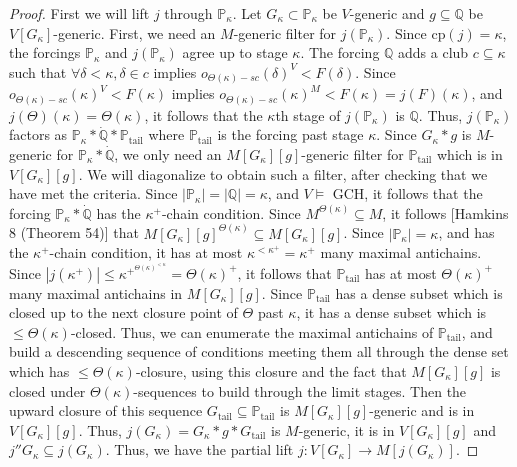 \documentclass[10pt,a4paper]{amsart}
\begin{document}
\begin{proof}
 First we will lift $j$ through $\mathbb{P}_{\kappa}$. Let $G_{\kappa} \subset \mathbb{P}_{\kappa}$ be $V$-generic and $g \subseteq \mathbb{Q}$ be $V[G_{\kappa}]$-generic. First, we need an $M$-generic filter for $j(\mathbb{P}_{\kappa})$. Since cp$(j) = \kappa$, the forcings $\mathbb{P}_{\kappa}$ and $j(\mathbb{P}_{\kappa})$ agree up to stage $\kappa$. The forcing $\mathbb{Q}$ adds a club $c \subseteq \kappa$ such that $\forall \delta < \kappa, \delta \in c$ implies $o_{\Theta(\kappa)-sc}(\delta)^V < F(\delta)$. Since $o_{\Theta(\kappa)-sc}(\kappa)^V < F(\kappa)$ implies $o_{\Theta(\kappa)-sc}(\kappa)^M < F(\kappa) = j(F)(\kappa)$, and $j(\Theta)(\kappa) = \Theta(\kappa)$, it follows that the $\kappa$th stage of $j(\mathbb{P}_{\kappa})$ is $\mathbb{Q}$. Thus, $j(\mathbb{P}_{\kappa})$ factors as $\mathbb{P}_{\kappa}*\dot{\mathbb{Q}}*\mathbb{P}_{\mbox{tail}}$ where $\mathbb{P}_{\mbox{tail}}$ is the forcing past stage $\kappa$. Since $G_{\kappa}*g$ is $M$-generic for $\mathbb{P}_{\kappa}*\dot{\mathbb{Q}}$, we only need an $M[G_{\kappa}][g]$-generic filter for $\mathbb{P}_{\mbox{tail}}$ which is in $V[G_{\kappa}][g]$. We will diagonalize to obtain such a filter, after checking that we have met the criteria. Since $|\mathbb{P}_{\kappa}|=|\mathbb{Q}| = \kappa$, and $V \models $ GCH, it follows that the forcing $\mathbb{P}_{\kappa}*\dot{\mathbb{Q}}$ has the $\kappa^+$-chain condition. Since $M^{\Theta(\kappa)} \subseteq M$, it follows [Hamkins 8 (Theorem 54)] that $M[G_{\kappa}][g]^{\Theta(\kappa)} \subseteq M[G_{\kappa}][g]$. Since $|\mathbb{P}_{\kappa}| = \kappa$, and has the $\kappa^+$-chain condition, it has at most $\kappa^{<\kappa^+} = \kappa^+$ many maximal antichains. Since $|j(\kappa^+)| \le \kappa^{+^{\Theta(\kappa)^{< \kappa}}} = \Theta(\kappa)^+$, it follows that $\mathbb{P}_{\mbox{tail}}$ has at most $\Theta(\kappa)^+$ many maximal antichains in $M[G_{\kappa}][g]$. Since $\mathbb{P}_{\mbox{tail}}$ has a dense subset which is closed up to the next closure point of $\Theta$ past $\kappa$, it has a dense subset which is $\le \Theta(\kappa)$-closed. Thus, we can enumerate the maximal antichains of $\mathbb{P}_{\mbox{tail}}$, and build a descending sequence of conditions meeting them all through the dense set which has $\le \Theta(\kappa)$-closure, using this closure and the fact that $M[G_{\kappa}][g]$ is closed under $\Theta(\kappa)$-sequences to build through the limit stages. Then the upward closure of this sequence $G_{\mbox{tail}} \subseteq \mathbb{P}_{\mbox{tail}}$ is $M[G_{\kappa}][g]$-generic and is in $V[G_{\kappa}][g]$. Thus, $j(G_{\kappa}) = G_{\kappa}*g*G_{\mbox{tail}}$ is $M$-generic, it is in $V[G_{\kappa}][g]$ and $j''G_{\kappa} \subseteq j(G_{\kappa})$. Thus, we have the partial lift $j: V[G_{\kappa}] \to M[j(G_{\kappa})]$.


\end{proof}
\end{document}
